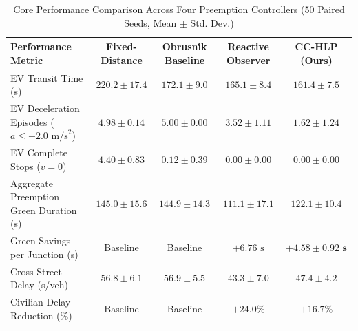 \documentclass[journal,10pt,twocolumn]{IEEEtran}
\begin{document}
\begin{table}[t]
\caption{Core Performance Comparison Across Four Preemption Controllers (50 Paired Seeds, Mean $\pm$ Std. Dev.)}
\label{tab:ablation_results}
\centering
\small
\begin{tabular*}{\textwidth}{@{\extracolsep{\fill}}lcccc@{}}
\toprule
\textbf{Performance Metric} & \textbf{Fixed-Distance} & \textbf{Obrusn\'{\i}k Baseline} & \textbf{Reactive Observer} & \textbf{CC-HLP (Ours)} \\
\midrule
EV Transit Time (s) & $220.2 \pm 17.4$ & $172.1 \pm 9.0$ & $165.1 \pm 8.4$ & $\mathbf{161.4 \pm 7.5}$ \\
EV Deceleration Episodes ($a \le -2.0\text{ m/s}^2$) & $4.98 \pm 0.14$ & $5.00 \pm 0.00$ & $3.52 \pm 1.11$ & $\mathbf{1.62 \pm 1.24}$ \\
EV Complete Stops ($v = 0$) & $4.40 \pm 0.83$ & $0.12 \pm 0.39$ & $0.00 \pm 0.00$ & $\mathbf{0.00 \pm 0.00}$ \\
Aggregate Preemption Green Duration (s) & $145.0 \pm 15.6$ & $144.9 \pm 14.3$ & $111.1 \pm 17.1$ & $\mathbf{122.1 \pm 10.4}$ \\
Green Savings per Junction (s) & Baseline & Baseline & $+6.76\text{ s}$ & $\mathbf{+4.58 \pm 0.92\text{ s}}$ \\
Cross-Street Delay (s/veh) & $56.8 \pm 6.1$ & $56.9 \pm 5.5$ & $43.3 \pm 7.0$ & $\mathbf{47.4 \pm 4.2}$ \\
Civilian Delay Reduction (\%) & Baseline & Baseline & $+24.0\%$ & $\mathbf{+16.7\%}$ \\
\bottomrule
\end{tabular*}
\end{table}
\end{document}
